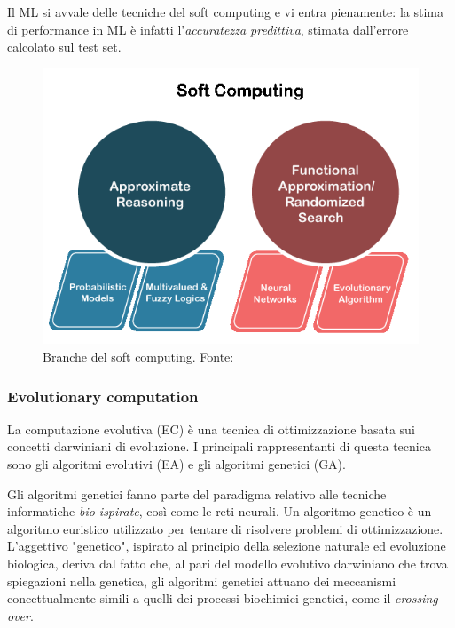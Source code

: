 Il ML si avvale delle tecniche del soft computing \supercite{MLwiki} e vi entra pienamente: la stima di performance in ML è infatti l'\textit{accuratezza predittiva}, stimata dall'errore calcolato sul test set.

\begin{figure}[!h]
	\centering
	\includegraphics[scale=0.4]{images/soft-computing.png}
	\caption{Branche del soft computing. Fonte: \cite{softComputing}}
	\label{fig:soft-computing}
\end{figure}

\subsubsection{Evolutionary computation}

La computazione evolutiva (EC) è una tecnica di ottimizzazione basata sui concetti darwiniani di evoluzione. I principali rappresentanti di questa tecnica sono gli algoritmi evolutivi (EA) e gli algoritmi genetici (GA).

\par Gli algoritmi genetici fanno parte del paradigma relativo alle tecniche informatiche \textit{bio-ispirate}, così come le reti neurali. Un algoritmo genetico è un algoritmo euristico utilizzato per tentare di risolvere problemi di ottimizzazione. L'aggettivo "genetico", ispirato al principio della selezione naturale ed evoluzione biologica, deriva dal fatto che, al pari del modello evolutivo darwiniano che trova spiegazioni nella genetica, gli algoritmi genetici attuano dei meccanismi concettualmente simili a quelli dei processi biochimici genetici, come il \textit{crossing over}.

